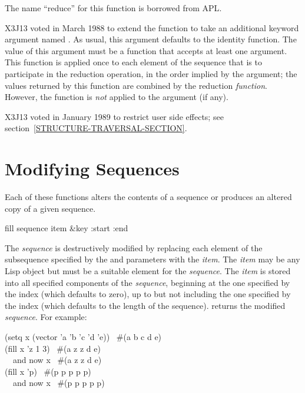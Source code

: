 \begin{defun}[Function]
The name ``reduce'' for this function is borrowed from {APL}.

\begin{new}
X3J13 voted in March 1988 
to extend the  function to take
an additional keyword argument named .  As usual, this argument
defaults to the identity function.  The value of this argument must be
a function that accepts at least one argument.  This function is applied once
to each element of the
sequence that is to participate in the reduction operation, in the order
implied by the  argument; the values returned by this
function are combined by the reduction {\it function}.
However, the  function is {\it not} applied
to the  argument (if any).
\end{new}

\begin{new}
X3J13 voted in January 1989
to restrict user side effects; see section~\ref{STRUCTURE-TRAVERSAL-SECTION}.
\end{new}
\end{defun}

\section{Modifying Sequences}

Each of these functions alters the contents of a sequence or produces
an altered copy of a given sequence.

\begin{defun}[Function]
fill sequence item &key :start :end

The {\it sequence} is destructively modified by replacing each element of
the subsequence specified by the  and  parameters
with the {\it item}.  The {\it item} may be any Lisp object but must be a
suitable element for the {\it sequence}.  The {\it item} is stored into all
specified components of the {\it sequence}, beginning at the one specified
by the  index (which defaults to zero), up to but not
including the one specified by the  index (which defaults to the
length of the sequence).   returns the modified {\it sequence}.
For example:
\begin{lisp}
(setq x (vector 'a 'b 'c 'd 'e)) \EV\ \#(a b c d e) \\
(fill x 'z  1  3) \EV\ \#(a z z d e) \\
~~{\rm and now} x \EV\ \#(a z z d e) \\
(fill x 'p) \EV\ \#(p p p p p) \\
~~{\rm and now} x \EV\ \#(p p p p p)
\end{lisp}
\end{defun}

